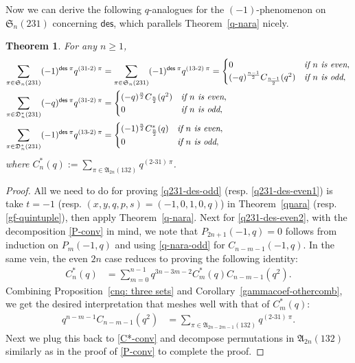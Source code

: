 \documentclass[12pt,reqno]{amsart}
\numberwithin{equation}{section}
\theoremstyle{plain}
\newtheorem{theorem}{Theorem}[section]
\theoremstyle{definition}
\def\S{\mathfrak{S}}
\def\D{\mathfrak{D}}
\def\A{\mathfrak{A}}
\def\des{\mathsf{des}}
\def\cab{31\text{-}2}
\def\bca{2\text{-}31}
\def\acb{13\text{-}2}
\begin{document}
Now we can derive the following $q$-analogues for the $(-1)$-phenomenon on $\S_n(231)$ concerning $\des$, which parallels Theorem~\ref{q-nara} nicely.
\begin{theorem}\label{thm:q231-des}
For any $n\ge 1$,
\begin{align}
\label{q231-des-odd}
\sum_{\pi\in\S_n(231)}(-1)^{\des\:\pi}q^{(\cab)\:\pi}&=\sum_{\pi\in\S_n(231)}(-1)^{\des\:\pi}q^{(\acb)\:\pi}=\begin{cases}0 & \emph{if $n$ is even},\\
(-q)^{\frac{n-1}{2}}C_{\frac{n-1}{2}}(q^2) & \emph{if $n$ is odd},
\end{cases}\\
\label{q231-des-even1}
\sum_{\pi\in\D^*_n(231)}(-q)^{\des\:\pi}q^{(\cab)\:\pi}&=\begin{cases}(-q)^{\frac{n}{2}}C_{\frac{n}{2}}(q^2) & \emph{if $n$ is even},\\
0 & \emph{if $n$ is odd},
\end{cases}\\
\label{q231-des-even2}
\sum_{\pi\in\D^*_n(231)}(-1)^{\des\:\pi}q^{(\acb)\:\pi}&=\begin{cases}(-1)^{\frac{n}{2}}C^*_{\frac{n}{2}}(q) & \emph{if $n$ is even},\\
0 & \emph{if $n$ is odd},
\end{cases}
\end{align}
where $C^*_n(q):=\sum\limits_{\pi\in\A_{2n}(132)}q^{(\bca)\:\pi}$.
\end{theorem}

\begin{proof}
All we need to do for proving \eqref{q231-des-odd} (resp. \eqref{q231-des-even1}) is take $t=-1$ (resp. $(x,y,q,p,s)=(-1,0,1,0,q)$) in Theorem~\ref{qnara} (resp. \eqref{gf-quintuple}), then apply Theorem~\ref{q-nara}. Next for \eqref{q231-des-even2}, with the decomposition \eqref{P-conv} in mind, we note that $P_{2n+1}(-1,q)=0$ follows from induction on $P_m(-1,q)$ and using \eqref{q-nara-odd} for $C_{n-m-1}(-1,q)$. In the same vein, the even $2n$ case reduces to proving the following identity:
\begin{align}\label{C*-conv}
C^*_n(q) &= \sum_{m=0}^{n-1}q^{3n-3m-2}C^*_m(q)C_{n-m-1}(q^2).
\end{align}
Combining Proposition~\ref{cnq: three sets} and Corollary~\ref{gammacoef-othercomb}, we get the desired interpretation that meshes well with that of $C^*_m(q)$:
\begin{align*}
q^{n-m-1}C_{n-m-1}(q^2) &= \sum_{\pi\in\A_{2n-2m-1}(132)}q^{(\bca)\:\pi}.
\end{align*}
Next we plug this back to \eqref{C*-conv} and decompose permutations in $\A_{2n}(132)$ similarly as in the proof of \eqref{P-conv} to complete the proof.
\end{proof}
\end{document}
